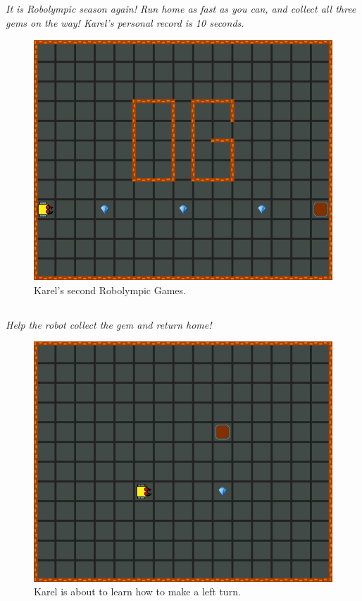 \documentclass[article,A4,12pt]{llncs}
\begin{document}
\subsection{}

{\em It is Robolympic season again! Run home as fast as you can, 
and collect all three gems on the way! Karel's personal record is 10 seconds.}


\begin{figure}[!ht]
\begin{center}
\includegraphics[height=0.4\textwidth]{imgk/a04.png}
\end{center}
\vspace{-4mm}
\caption{Karel's second Robolympic Games.}
\label{fig:a04}
\vspace{-1cm}
\end{figure}
\noindent


\subsection{}

{\em Help the robot collect the gem and return home!}

\begin{figure}[!ht]
\begin{center}
\includegraphics[height=0.4\textwidth]{imgk/a05.png}
\end{center}
\vspace{-4mm}
\caption{Karel is about to learn how to make a left turn.}
\label{fig:a05}
\vspace{-1cm}
\end{figure}
\noindent
\end{document}
